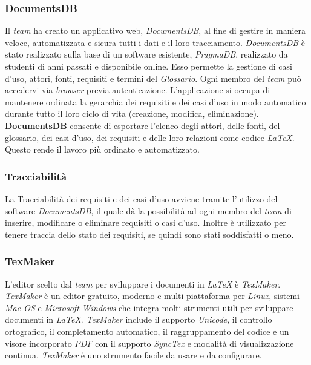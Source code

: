 \subsubsection{DocumentsDB}
Il \textit{team} ha creato un applicativo web, \textit{DocumentsDB}, al fine di gestire in maniera veloce, automatizzata
e sicura tutti i dati e il loro tracciamento. \textit{DocumentsDB} è stato realizzato sulla base di un software esistente, \textit{PragmaDB}, realizzato da
studenti di anni passati e disponibile online. Esso permette la gestione di casi d'uso, attori, fonti, requisiti e termini del \textit{Glossario}.
Ogni membro del \textit{team} può accedervi via \textit{browser} previa autenticazione.
L'applicazione si occupa di mantenere ordinata la gerarchia dei requisiti e dei casi d'uso in modo automatico durante tutto il loro ciclo di vita (creazione, modifica, eliminazione).
\textbf{DocumentsDB} consente di esportare l'elenco degli attori, delle fonti, del glossario, dei casi d'uso, dei requisiti e delle loro relazioni come codice \textit{\LaTeX{}}.
Questo rende il lavoro più ordinato e automatizzato.

\subsubsection{Tracciabilità}
La Tracciabilità dei requisiti e dei casi d'uso avviene tramite l'utilizzo del software \textit{DocumentsDB}, il quale dà la possibilità ad ogni membro del \textit{team} di inserire, modificare o eliminare requisiti o casi d'uso.
Inoltre è utilizzato per tenere traccia dello stato dei requisiti, se quindi sono stati soddisfatti o meno.

\subsubsection{TexMaker}
L'editor scelto dal \textit{team} per sviluppare i documenti in \textit{\LaTeX{}} è \textit{TexMaker}.
\textit{TexMaker} è un editor gratuito, moderno e multi-piattaforma per \textit{Linux}, sistemi \textit{Mac OS} e \textit{Microsoft Windows} che integra molti strumenti utili per sviluppare documenti in \textit{\LaTeX{}}.
\textit{TexMaker} include il supporto \textit{Unicode}, il controllo ortografico, il completamento automatico, il raggruppamento del codice e un visore incorporato \textit{PDF} con il supporto \textit{SyncTex} e modalità di visualizzazione continua.
\textit{TexMaker} è uno strumento facile da usare e da configurare.

